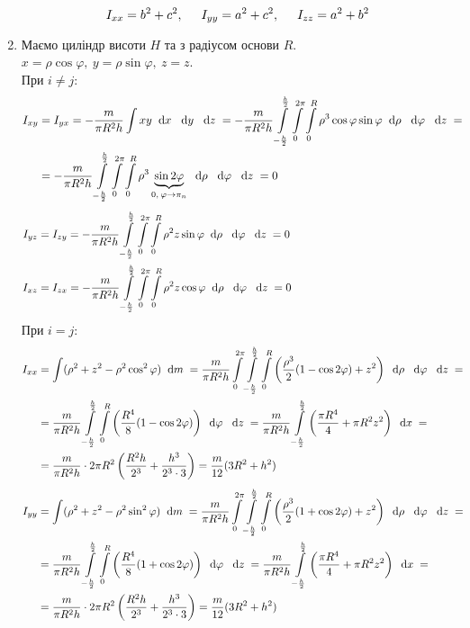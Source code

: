 \documentclass[a4paper,12pt]{article}
\newcommand\dx[1]{\hspace*{0.2cm}\textrm{d}{#1}\hspace*{0.1cm}}
\newcommand\tab [1][0.5cm]{\hspace*{#1}}
\newcommand\dint{\displaystyle\int}
\begin{document}
\begin{justify}
\begin{enumerate}[label=\alph*)]
				\begin{equation}
					I_{xx}=b^2+c^2,\tab I_{yy}=a^2+c^2,\tab I_{zz}=a^2+b^2
					\label{inertia_190c}
				\end{equation}
			\item Маємо циліндр висоти $H$ та з радіусом основи $R$. $x=\rho\cos\varphi,\>y=\rho\sin\varphi,\>z=z$. \\При $i\neq j$: 
				\begin{align*}
					I_{xy}&=I_{yx}=-\dfrac{m}{\pi R^2 h}\dint xy\dx{x}\dx{y}\dx{z}=-\dfrac{m}{\pi R^2 h}\dint\limits_{-\frac h2}^{\frac h2}\dint\limits_0^{2\pi}\dint\limits_0^R\rho^3\cos\varphi\sin\varphi\dx{\rho}\dx{\varphi}\dx{z}=&\\&=-\dfrac{m}{\pi R^2 h}\dint\limits_{-\frac h2}^{\frac h2}\dint\limits_0^{2\pi}\dint\limits_0^R\rho^3\underbrace{\sin2\varphi}_{0,\>\varphi\to \pi_n}\dx{\rho}\dx{\varphi}\dx{z}=0
				\end{align*}
				\begin{align*}
					I_{yz}&=I_{zy}=-\dfrac{m}{\pi R^2 h}\dint\limits_{-\frac h2}^{\frac h2}\dint\limits_0^{2\pi}\dint\limits_0^R\rho^2z\sin\varphi\dx{\rho}\dx{\varphi}\dx{z}=0\hspace*{5.5cm}&\\
					I_{xz}&=I_{zx}=-\dfrac{m}{\pi R^2 h}\dint\limits_{-\frac h2}^{\frac h2}\dint\limits_0^{2\pi}\dint\limits_0^R\rho^2z\cos\varphi\dx{\rho}\dx{\varphi}\dx{z}=0
				\end{align*}
				При $i=j$:
				\begin{align*}
					I_{xx}&=\dint(\rho^2+z^2-\rho^2\cos^2\varphi)\dx{m}=\dfrac{m}{\pi R^2 h}\dint\limits_0^{2\pi}\dint\limits_{-\frac h2}^{\frac h2}\dint\limits_0^R\left(\dfrac{\rho^3}{2}(1-\cos2\varphi)+z^2\right)\dx{\rho}\dx{\varphi}\dx{z}=&\\&=\dfrac{m}{\pi R^2 h}\dint\limits_{-\frac h2}^{\frac h2}\dint\limits_0^R\left(\dfrac{R^4}{8}(1-\cos2\varphi)\right)\dx{\varphi}\dx{z}=\dfrac{m}{\pi R^2 h}\dint\limits_{-\frac h2}^{\frac h2}\left(\dfrac{\pi R^4}{4}+\pi R^2z^2\right)\dx{x}=\\&=\dfrac{m}{\pi R^2 h}\cdot2\pi R^2\left(\dfrac{R^2h}{2^3}+\dfrac{h^3}{2^3\cdot3}\right)=\dfrac{m}{12}(3R^2+h^2)\\
				\end{align*}
				\begin{align*}
					I_{yy}&=\dint(\rho^2+z^2-\rho^2\sin^2\varphi)\dx{m}=\dfrac{m}{\pi R^2 h}\dint\limits_0^{2\pi}\dint\limits_{-\frac h2}^{\frac h2}\dint\limits_0^R\left(\dfrac{\rho^3}{2}(1+\cos2\varphi)+z^2\right)\dx{\rho}\dx{\varphi}\dx{z}=&\\&=\dfrac{m}{\pi R^2 h}\dint\limits_{-\frac h2}^{\frac h2}\dint\limits_0^R\left(\dfrac{R^4}{8}(1+\cos2\varphi)\right)\dx{\varphi}\dx{z}=\dfrac{m}{\pi R^2 h}\dint\limits_{-\frac h2}^{\frac h2}\left(\dfrac{\pi R^4}{4}+\pi R^2z^2\right)\dx{x}=\\&=\dfrac{m}{\pi R^2 h}\cdot2\pi R^2\left(\dfrac{R^2h}{2^3}+\dfrac{h^3}{2^3\cdot3}\right)=\dfrac{m}{12}(3R^2+h^2)&\\

\end{align*}
\end{enumerate}
\end{justify}
\end{document}
